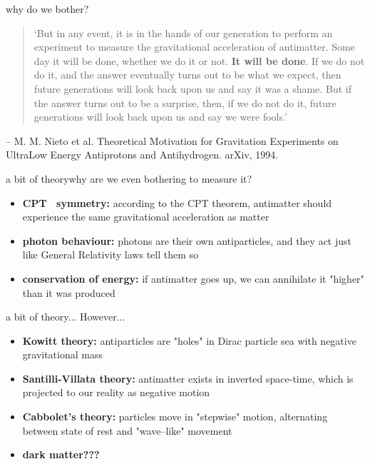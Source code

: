 \documentclass[aspectratio=1612]{beamer}
\begin{document}
\begin{frame}{why do we bother?}{}
  
\begin{quotation}
‘But in any event, it is in the hands of our generation to perform an experiment to measure the gravitational acceleration of antimatter. Some day it will be done, whether we do it or not. \textbf{It will be done}. If we do not do it, and the answer eventually turns out to be what we expect, then future generations will look back upon us and say it was a shame. But if the answer turns out to be a surprise, then, if we do not do it, future generations will look back upon us and say we were fools.’
\end{quotation}
\raggedleft -- M. M. Nieto et al. Theoretical Motivation for Gravitation Experiments on UltraLow Energy Antiprotons and Antihydrogen. arXiv, 1994.

\end{frame}

\begin{frame}{a bit of theory}{why are we even bothering to measure it?}



        \begin{itemize}
            \item \textbf{CPT%
            \ symmetry:} according to the CPT theorem, antimatter should experience the same gravitational acceleration as matter
            \item \textbf{photon behaviour:} photons are their own antiparticles, and they act just like General Relativity laws tell them so
            \item \textbf{conservation of energy:} if antimatter goes up, we can annihilate it "higher" than it was produced
        \end{itemize}
      \end{frame}
      \begin{frame}{a bit of theory...}{}
        However...
        \begin{itemize}
            \item \textbf{Kowitt theory:} antiparticles are "holes" in Dirac particle sea with negative gravitational mass
            \item \textbf{Santilli-Villata theory:} antimatter exists in inverted space-time, which is projected to our reality as negative motion
            \item \textbf{Cabbolet's theory:} particles move in "stepwise" motion, alternating between state of rest and "wave--like" movement
            \item \textbf{dark matter???}%
        \end{itemize}

\end{frame}
\end{document}

